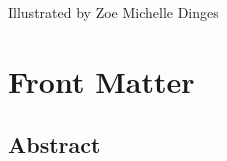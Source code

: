 \documentclass[
  letterpaper,
]{book}
\renewcommand*\contentsname{Table of contents}
\newcommand\contentsname{Table of contents}
\begin{document}
\begin{frontmatter}
\begin{titlepage}
{\vspace{1pt}
}

\newcommand{\dateblock}{{\titlepagedateblock}

\vspace{0pt}
}

\newcommand{\headerblock}{}

\thispagestyle{empty} %


\newlength{\minipagewidth}
\setlength{\minipagewidth}{\textwidth}
\raggedright %
\begin{minipage}[b][\textheight][s]{\minipagewidth}
\titlepagepagealign
\titleblock

\authorblock

\Large Illustrated by Zoe Michelle Dinges

\vfill

\logoblock

\footerblock
\par

\end{minipage}
\clearpage
\restoregeometry


\clearpage
\end{titlepage}
\setcounter{page}{1}
\end{frontmatter}


\renewcommand*\contentsname{Contents}
{
\hypersetup{linkcolor=}
\setcounter{tocdepth}{2}
\tableofcontents
}
\listoffigures
\listoftables
\mainmatter
{}

\chapter*{Front Matter}\label{front-matter}


\section*{Abstract}\label{abstract}
\end{document}
